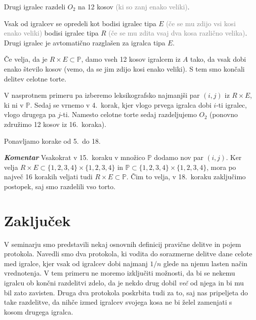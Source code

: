 \documentclass[a4paper,12pt]{article}
\def\P{\mathbb{P}}
\begin{document}
\begin{protokol}
\item Drugi igralec razdeli $O_2$ na 12 kosov \textcolor{gray}{(ki so zanj enako veliki)}.

\item Vsak od igralcev se opredeli kot bodisi igralec tipa $E$ \textcolor{gray}{(če se mu zdijo vsi kosi enako veliki)} bodisi igralec tipa $R$ \textcolor{gray}{(če se mu zdita vsaj dva kosa različno velika)}. Drugi igralec je avtomatično razglašen za igralca tipa $E$.

\item Če velja, da je  $R \times E \subset \P$, damo vseh 12 kosov igralcem iz $A$ tako, da vsak dobi enako število kosov (vemo, da se jim zdijo kosi enako veliki). S tem smo končali delitev celotne torte.

\item V nasprotnem primeru pa izberemo leksikografsko najmanjši par $(i, j)$ iz $R \times E$, ki ni v $\P$. Sedaj se vrnemo v 4.~korak, kjer vlogo prvega igralca dobi $i$-ti igralec, vlogo drugega pa $j$-ti. Namesto celotne torte sedaj razdeljujemo $O_2$ (ponovno združimo 12 kosov iz 16.~koraka).

\item Ponavljamo korake od 5.~do 18.

 \item [\textbf{\em Komentar}] Vsakokrat v 15.~koraku v množico $\P$ dodamo nov par $(i, j)$. Ker velja $R \times E \subset {\{1, 2, 3, 4\}} \times {\{1, 2, 3, 4\}}$ in $\P \subset {\{1, 2, 3, 4\}} \times {\{1, 2, 3, 4\}}$, mora po največ 16 korakih veljati tudi $R \times E \subset \P$. Čim to velja, v 18.~koraku zaključimo postopek, saj smo razdelili vso torto.
 
 \end{protokol}
 
 \section{Zaključek}
 
 V seminarju smo predstavili nekaj osnovnih definicij pravične delitve in pojem protokola. Navedli smo dva protokola, ki vodita do sorazmerne delitve dane celote med igralce, kjer vsak od igralcev dobi najmanj $1/n$ glede na njemu lasten način vrednotenja. V tem primeru ne moremo izključiti možnosti, da bi se nekemu igralcu ob končni razdelitvi zdelo, da je nekdo drug dobil {\em več} od njega in bi mu bil zato zavisten. Druga dva protokola poskrbita tudi za to, saj nas pripeljeta do take razdelitve, da nihče izmed igralcev svojega kosa ne bi želel zamenjati s kosom drugega igralca.
 
\end{document}
